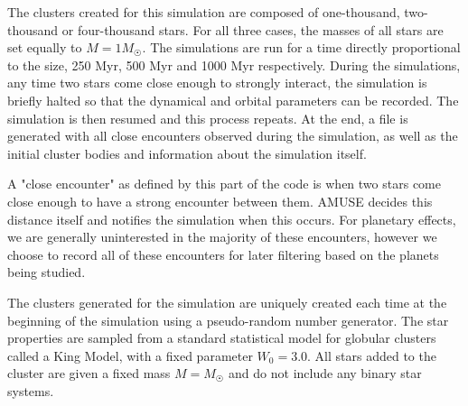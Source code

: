 \documentclass[12pt]{article}
\begin{document}
    The clusters created for this simulation are composed of one-thousand, two-thousand
    or four-thousand stars. For all three cases, the masses of all stars are set equally
    to $M = 1 M_{\astrosun}$. The simulations are run for a time directly proportional
    to the size, 250 Myr, 500 Myr and 1000 Myr respectively.  During the simulations, 
    any time two stars
    come close enough to strongly interact, the simulation is briefly halted so that
    the dynamical and orbital parameters can be recorded. The simulation is then
    resumed and this process repeats. At the end, a file is generated with
    all close encounters observed during the simulation, as well as the initial
    cluster bodies and information about the simulation itself.

    A "close encounter" as defined by this part of the code is when two stars
    come close enough to have a strong encounter between them. AMUSE decides
    this distance itself and notifies the simulation when this occurs. For planetary
    effects, we are generally uninterested in the majority of these encounters, however
    we choose to record all of these encounters for later filtering based on the
    planets being studied.

    The clusters generated for the simulation are uniquely created each time at the
    beginning of the simulation using a pseudo-random number generator. 
    The star properties are sampled from a standard statistical model for globular
    clusters called a
    King Model, with a fixed parameter $W_0=3.0$. 
    All stars added to the cluster are given a fixed mass $M=M_{\astrosun}$ and do not
    include any binary star systems.     
\end{document}
